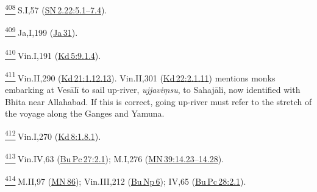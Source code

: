 \label{footprints_split_025.html}{}

\label{footprints_split_025.html_footnotes}
\label{footprints_split_025.html_fn408}
\hyperref[footprints_split_012.htmlux5cux23fnref408]{\textsuperscript{408}} S.I,57
(\href{https://suttacentral.net/sn2.22/en/sujato\#5.1}{SN\,2.22:5.1--7.4}).

\label{footprints_split_025.html_fn409}
\hyperref[footprints_split_012.htmlux5cux23fnref409]{\textsuperscript{409}} Ja,I,199
(\href{https://suttacentral.net/ja31}{Ja\,31}).

\label{footprints_split_025.html_fn410}
\hyperref[footprints_split_012.htmlux5cux23fnref410]{\textsuperscript{410}} Vin.I,191
(\href{https://suttacentral.net/pli-tv-kd5/en/brahmali?\#9.1.4}{Kd\,5:9.1.4}).

\label{footprints_split_025.html_fn411}
\hyperref[footprints_split_012.htmlux5cux23fnref411]{\textsuperscript{411}} Vin.II,290
(\href{https://suttacentral.net/pli-tv-kd21/en/brahmali?\#1.12.13}{Kd\,21:1.12.13}).
Vin.II,301
(\href{https://suttacentral.net/pli-tv-kd22/en/brahmali?\#2.1.11}{Kd\,22:2.1.11})
mentions monks embarking at Vesālī to sail up-river, \emph{ujjaviṃsu},
to Sahajāli, now identified with Bhita near Allahabad. If this is
correct, going up-river must refer to the stretch of the voyage along
the Ganges and Yamuna.

\label{footprints_split_025.html_fn412}
\hyperref[footprints_split_012.htmlux5cux23fnref412]{\textsuperscript{412}} Vin.I,270
(\href{https://suttacentral.net/pli-tv-kd8/en/brahmali?\#1.8.1}{Kd\,8:1.8.1}).

\label{footprints_split_025.html_fn413}
\hyperref[footprints_split_012.htmlux5cux23fnref413]{\textsuperscript{413}} Vin.IV,63
(\href{https://suttacentral.net/pli-tv-bu-vb-pc27/en/brahmali?l\#2.1}{Bu\,Pc\,27:2.1});
M.I,276
(\href{https://suttacentral.net/mn39/en/sujato\#14.23}{MN\,39:14.23--14.28}).

\label{footprints_split_025.html_fn414}
\hyperref[footprints_split_012.htmlux5cux23fnref414]{\textsuperscript{414}} M.II,97
(\href{https://suttacentral.net/mn86/en/sujato}{MN\,86}); Vin.III,212
(\href{https://suttacentral.net/pli-tv-bu-vb-np6/en/brahmali?layout=plain&reference=main/pts&notes=asterisk&highlight=false&script=latin\#2.1}{Bu\,Np\,6});
IV,65
(\href{https://suttacentral.net/pli-tv-bu-vb-pc28/en/brahmali?\#2.1}{Bu\,Pc\,28:2.1}).

